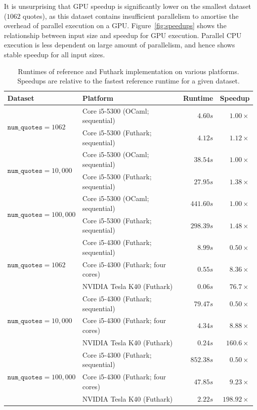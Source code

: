 \documentclass{article}
\begin{document}
It is unsurprising that GPU speedup is significantly lower on the
smallest dataset ($1062$ quotes), as this dataset contains
insufficient parallelism to amortise the overhead of parallel
execution on a GPU.  Figure~\ref{fig:speedups} shows the relationship
between input size and speedup for GPU execution.  Parallel CPU
execution is less dependent on large amount of parallelism, and hence
shows stable speedup for all input sizes.

\begin{table}
  \centering
\begin{tabular}{l|l|r|r}
  \textbf{Dataset} & \textbf{Platform} & \textbf{Runtime} & \textbf{Speedup} \\\hline\hline

  \multirow{2}{*}{$\texttt{num\_quotes}=1062$} & Core i5-5300 (OCaml; sequential) & $4.60s$ & $1.00\times$ \\
  & Core i5-5300 (Futhark; sequential) & $4.12s$ & $1.12\times$ \\\hline
  \multirow{2}{*}{$\texttt{num\_quotes}=10,000$} & Core i5-5300 (OCaml; sequential) & $38.54s$ & $1.00\times$ \\
  & Core i5-5300 (Futhark; sequential) & $27.95s$ & $1.38\times$  \\\hline
  \multirow{2}{*}{$\texttt{num\_quotes}=100,000$} & Core i5-5300 (OCaml; sequential) & $441.60s$ & $1.00\times$ \\
  & Core i5-5300 (Futhark; sequential) & $298.39s$ & $1.48\times$ \\\hline

  \multirow{3}{*}{$\texttt{num\_quotes}=1062$} & Core i5-4300 (Futhark; sequential) & $8.99s$ & $0.50\times$ \\
  & Core i5-4300 (Futhark; four cores) & $0.55s$ & $8.36\times$ \\
  & NVIDIA Tesla K40 (Futhark) & $0.06s$ & $76.7\times$ \\\hline

  \multirow{3}{*}{$\texttt{num\_quotes}=10,000$} & Core i5-4300 (Futhark; sequential) & $79.47s$ & $0.50\times$ \\
  & Core i5-4300 (Futhark; four cores) & $4.34s$ & $8.88\times$ \\
  & NVIDIA Tesla K40 (Futhark) & $0.24s$ & $160.6\times$ \\\hline


  \multirow{3}{*}{$\texttt{num\_quotes}=100,000$} & Core i5-4300 (Futhark; sequential) & $852.38s$ & $0.50\times$ \\
  & Core i5-4300 (Futhark; four cores) & $47.85s$ & $9.23\times$ \\
  & NVIDIA Tesla K40 (Futhark) & $2.22s$ & $198.92\times$ \\
\end{tabular}
  \caption{Runtimes of reference and Futhark implementation on various platforms.  Speedups are relative to the fastest reference runtime for a given dataset.}
  \label{tab:runtimes}
\end{table}
\end{document}
